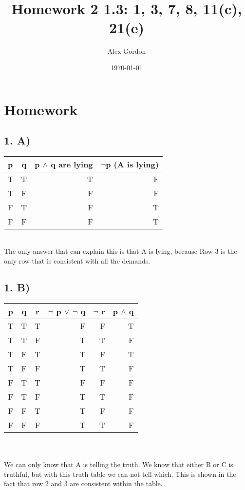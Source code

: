 \documentclass[]{article}
\begin{document}
\title{Homework 2 1.3: 1, 3, 7, 8, 11(c), 21(e)}
\author{Alex Gordon}
\date{\today}
\maketitle

\section*{Homework}
\subsection*{1. A)}

\begin{tabular}{ l | c || r || r ||}
 p & q & p $\wedge$ q are lying &$\neg$p (A is lying) \\
  \hline                        
  T & T & T & F\\
  T & F & F & F\\
  F & T & F & T\\
  F & F & F & T\\
  \hline  
\end{tabular}
\\ The only answer that can explain this is that A is lying, because Row 3 is the only row that is consistent with all the demands.
\subsection*{1. B)}
\begin{tabular}{ | c | c | c || r || r || r || }
 p & q & r & $\neg$ p $\vee$ $\neg$ q &$\neg$ r & p $\wedge$ q \\
  \hline
  T & T & T & F & F & T\\   
  T & T & F & T & T & F\\   
  T & F & T & T & F & T\\           
  T & F & F & T & T & F\\ 
  F & T & T & F & F & F\\           
  F & T & F & T & T & F\\           
  F & F & T & T & F & F\\           
  F & F & F & T & T & F\\                                                  
  \hline  
\end{tabular} \\
\\ We can only know that A is telling the truth. We know that either B or C is truthful, but with this truth table we can not tell which. This is shown in the fact that row 2 and 3 are consistent within the table. 
\end{document}
